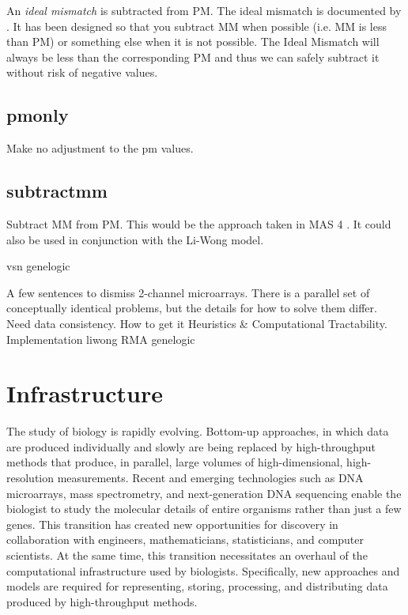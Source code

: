 An \emph{ideal mismatch} is subtracted from PM. The ideal mismatch is documented by \cite{affy:tech:2002}. It has been designed so that you subtract MM when possible (i.e. MM is less than PM) or something else when it is not possible. The Ideal Mismatch will always be less than the corresponding PM and thus we can safely subtract it without risk of negative values.

\subsection{pmonly}

Make no adjustment to the pm values.

\subsection{subtractmm}

Subtract MM from PM. This would be the approach taken in MAS 4 \cite{affy4}. It could also be used in conjunction with the Li-Wong model.

vsn			\cite{PMID_12169536}
genelogic		\cite{PMID_17059591}

A few sentences to dismiss 2-channel microarrays.  There is a parallel set of conceptually identical problems, but the details for how to solve them differ.
Need data consistency.  How to get it
Heuristics \& Computational Tractability.  Implementation
liwong			\cite{PMID_11134512,PMID_11532216}
RMA			\cite{PMID_12582260,PMID_12925520}
genelogic		\cite{PMID_17059591}

\section{Infrastructure}
\label{Infrastructure}

The study of biology is rapidly evolving.  Bottom-up approaches, in which data
are produced individually and slowly are being replaced by high-throughput
methods that produce, in parallel, large volumes of high-dimensional,
high-resolution measurements.  Recent and emerging technologies such as DNA
microarrays, mass spectrometry, and next-generation DNA sequencing enable the
biologist to study the molecular details of entire organisms rather than just a
few genes.  This transition has created new opportunities for discovery in
collaboration with engineers, mathematicians, statisticians, and computer
scientists.  At the same time, this transition necessitates an overhaul of the
computational infrastructure used by biologists.  Specifically, new approaches and
models are required for representing, storing, processing, and distributing
data produced by high-throughput methods.

